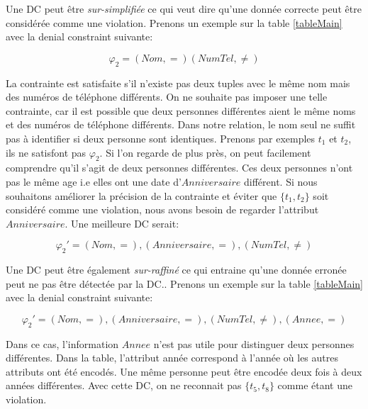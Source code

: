 \documentclass[letterpaper, 12pt]{report}
\theoremstyle{definition}
\begin{document}
Une DC peut être \emph{sur-simplifiée} ce qui veut dire qu'une donnée correcte peut être considérée comme une violation. Prenons un exemple sur la table \ref{tableMain} avec la denial constraint suivante:

$$\varphi_2 = (Nom,=)(NumTel,\neq) $$


La contrainte est satisfaite s'il n'existe pas deux tuples avec le même nom mais des numéros de téléphone différents. On ne souhaite pas imposer une telle contrainte, car il est possible que deux personnes différentes aient le même noms et des numéros de téléphone différents. Dans notre relation, le nom seul ne suffit pas à identifier si deux personne sont identiques. Prenons par exemples $t_1$ et $t_2$, ils ne satisfont pas $\varphi_2$. Si l'on regarde de plus près, on peut facilement comprendre qu'il s'agit de deux personnes différentes. Ces deux personnes n'ont pas le même age i.e elles ont une date d'$Anniversaire$ différent. Si nous souhaitons améliorer la précision de la contrainte et éviter que $\{ t_1,t_2 \}$ soit considéré comme une violation, nous avons besoin de regarder l'attribut $Anniversaire$. Une meilleure DC serait:

$$\varphi_2' = (Nom,=),(Anniversaire,=),(NumTel,\neq) $$

Une DC peut être également \emph{sur-raffiné} ce qui entraine qu'une donnée erronée peut ne pas être détectée par la DC.. Prenons un exemple sur la table \ref{tableMain} avec la denial constraint suivante:

$$\varphi_2' = (Nom,=),(Anniversaire,=),(NumTel,\neq),(Annee,=) $$

Dans ce cas, l'information $Annee$ n'est pas utile pour distinguer deux personnes différentes. Dans la table, l'attribut année correspond à l'année où les autres attributs ont été encodés. Une même personne peut être encodée deux fois à deux années différentes. Avec cette DC, on ne reconnait pas $\{ t_5,t_8 \}$ comme étant une violation.

\end{document}
